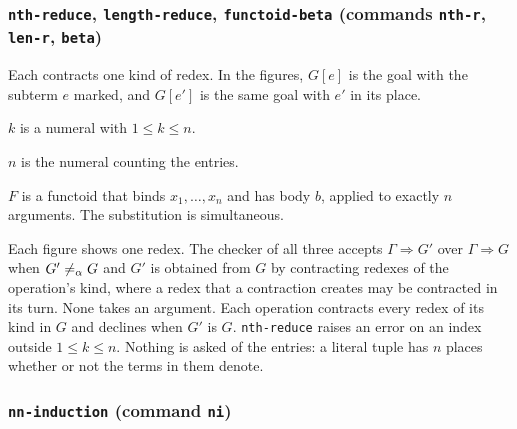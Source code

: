 \subsubsection*{\texttt{nth-reduce}, \texttt{length-reduce},
  \texttt{functoid-beta} (commands \texttt{nth-r}, \texttt{len-r},
  \texttt{beta})}

Each contracts one kind of redex.  In the figures, $G[e]$ is the goal
with the subterm $e$ marked, and $G[e']$ is the same goal with $e'$ in
its place.

\label{kop:nth-reduce}%
\begin{VNBcond}
\item[Index] $k$ is a numeral with $1 \leq k \leq n$.
\end{VNBcond}

\label{kop:length-reduce}%
\begin{VNBcond}
\item[Result] $n$ is the numeral counting the entries.
\end{VNBcond}

\label{kop:functoid-beta}%
\begin{VNBcond}
\item[Redex] $F$ is a functoid that binds $x_1, \ldots, x_n$ and has
  body $b$, applied to exactly $n$ arguments.  The substitution is
  simultaneous.
\end{VNBcond}

Each figure shows one redex.  The checker of all three accepts
$\Gamma \Longrightarrow G'$ over $\Gamma \Longrightarrow G$ when
$G' \not=_{\alpha} G$ and $G'$ is obtained from $G$ by contracting redexes of
the operation's kind, where a redex that a contraction creates may be
contracted in its turn.
None takes an argument.  Each operation contracts every redex of its
kind in $G$ and declines when $G'$ is $G$.  \texttt{nth-reduce} raises an
error on an index outside $1 \leq k \leq n$.  Nothing is asked of the
entries: a literal tuple has $n$ places whether or not the terms in them
denote.

\subsubsection*{\texttt{nn-induction} (command \texttt{ni})}

